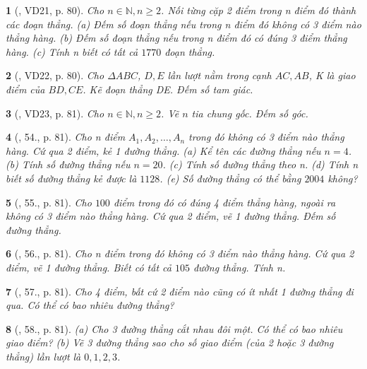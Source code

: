 \documentclass{article}
\newtheorem{baitoan}{}
\begin{document}
\begin{baitoan}[\cite{Binh_Toan_6_tap_2}, VD21, p. 80]
	Cho $n\in\mathbb{N},n\ge2$. Nối từng cặp 2 điểm trong n điểm đó thành các đoạn thẳng. (a) Đếm số đoạn thẳng nếu trong n điểm đó không có 3 điểm nào thẳng hàng. (b) Đếm số đoạn thẳng nếu trong n điểm đó có đúng 3 điểm thẳng hàng. (c) Tính n biết có tất cả $1770$ đoạn thẳng.
\end{baitoan}

\begin{baitoan}[\cite{Binh_Toan_6_tap_2}, VD22, p. 80]
	Cho $\Delta ABC$, $D,E$ lần lượt nằm trong cạnh $AC,AB$, K là giao điểm của $BD,CE$. Kẽ đoạn thẳng DE. Đếm số tam giác. 
\end{baitoan}

\begin{baitoan}[\cite{Binh_Toan_6_tap_2}, VD23, p. 81]
	Cho $n\in\mathbb{N},n\ge2$. Vẽ $n$ tia chung gốc. Đếm số góc.
\end{baitoan}

\begin{baitoan}[\cite{Binh_Toan_6_tap_2}, 54., p. 81]
	Cho n điểm $A_1,A_2,\ldots,A_n$ trong đó không có 3 điểm nào thẳng hàng. Cứ qua 2 điểm, kẻ 1 đường thẳng. (a) Kể tên các đường thẳng nếu $n = 4$. (b) Tính số đường thẳng nếu $n = 20$. (c) Tính số đường thẳng theo n. (d) Tính n biết số đường thẳng kẻ được là $1128$. (e) Số đường thẳng có thể bằng $2004$ không?
\end{baitoan}

\begin{baitoan}[\cite{Binh_Toan_6_tap_2}, 55., p. 81]
	Cho $100$ điểm trong đó có đúng 4 điểm thẳng hàng, ngoài ra không có 3 điểm nào thẳng hàng. Cứ qua 2 điểm, vẽ 1 đường thẳng. Đếm số đường thẳng.
\end{baitoan}

\begin{baitoan}[\cite{Binh_Toan_6_tap_2}, 56., p. 81]
	Cho n điểm trong đó không có 3 điểm nào thẳng hàng. Cứ qua 2 điểm, vẽ 1 đường thẳng. Biết có tất cả $105$ đường thẳng. Tính n.
\end{baitoan}

\begin{baitoan}[\cite{Binh_Toan_6_tap_2}, 57., p. 81]
	Cho 4 điểm, bất cứ 2 điểm nào cũng có ít nhất 1 đường thẳng đi qua. Có thể có bao nhiêu đường thẳng?
\end{baitoan}

\begin{baitoan}[\cite{Binh_Toan_6_tap_2}, 58., p. 81]
	(a) Cho 3 đường thẳng cắt nhau đôi một. Có thể có bao nhiêu giao điểm? (b) Vẽ 3 đường thẳng sao cho số giao điểm (của 2 hoặc 3 đường thẳng) lần lượt là $0,1,2,3$.
\end{baitoan}
\end{document}
